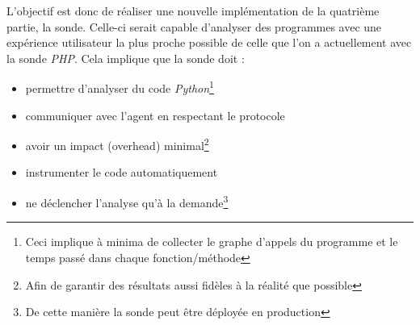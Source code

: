 L'objectif est donc de réaliser une nouvelle implémentation de la quatrième partie, la sonde. Celle-ci serait capable d'analyser des programmes \Python avec une expérience utilisateur la plus proche possible de celle que l'on a actuellement avec la sonde \emph{PHP}. Cela implique que la sonde doit :
\begin{itemize}
  \item permettre d'analyser du code \emph{Python}\footnote{Ceci implique à minima de collecter le graphe d'appels du programme et le temps passé dans chaque fonction/méthode}
  \item communiquer avec l'agent en respectant le protocole\footnotemark[1]
  \item avoir un impact (\gls{overhead}) minimal\footnote{Afin de garantir des résultats aussi fidèles à la réalité que possible}
  \item instrumenter le code automatiquement
  \item ne déclencher l'analyse qu'à la demande\footnote{De cette manière la sonde peut être déployée en production}
\end{itemize}

\setcounter{part}{0}
\setcounter{chapter}{0} 